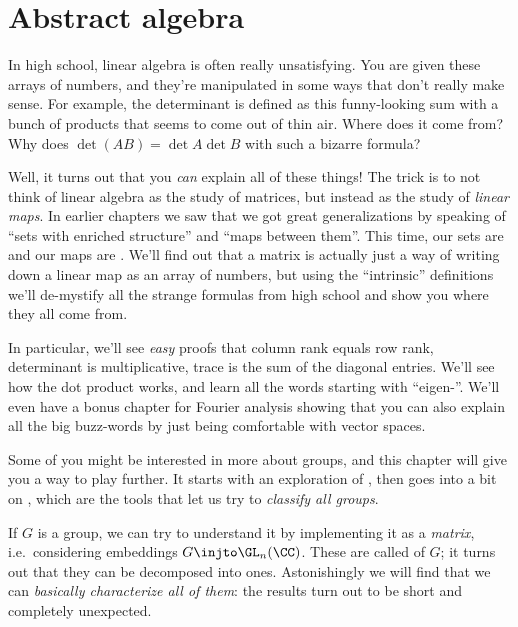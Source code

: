 \section{Abstract algebra}
\begin{itemize}
In high school, linear algebra is often really unsatisfying.
You are given these arrays of numbers,
and they're manipulated in some ways that don't really make sense.
For example, the determinant is defined as this
funny-looking sum with a bunch of products that seems
to come out of thin air. Where does it come from?
Why does $\det(AB) = \det A \det B$ with such a bizarre formula?

Well, it turns out that you \emph{can} explain all of these things!
The trick is to not think of linear algebra
as the study of matrices,
but instead as the study of \emph{linear maps}.
In earlier chapters we saw that we got great generalizations
by speaking of ``sets with enriched structure'' and ``maps between them''.
This time, our sets are 
and our maps are .
We'll find out that a matrix is actually just
a way of writing down a linear map as an array of numbers,
but using the ``intrinsic'' definitions
we'll de-mystify all the strange formulas from high school
and show you where they all come from.

In particular, we'll see \emph{easy} proofs
that column rank equals row rank,
determinant is multiplicative, trace is the sum of the diagonal entries.
We'll see how the dot product works,
and learn all the words starting with ``eigen-''.
We'll even have a bonus chapter for Fourier analysis
showing that you can also explain all the big buzz-words
by just being comfortable with vector spaces.

Some of you might be interested in more about groups,
and this chapter will give you a way to play further.
It starts with an exploration of ,
then goes into a bit on ,
which are the tools that let us try to \emph{classify all groups}.

If $G$ is a group, we can try to understand
it by implementing it as a \emph{matrix},
i.e.\ considering embeddings $G \injto \GL_n(\CC)$.
These are called  of $G$;
it turns out that they can be decomposed into  ones.
Astonishingly we will find that we can
\emph{basically characterize all of them}:
the results turn out to be short and completely unexpected.


\end{itemize}
